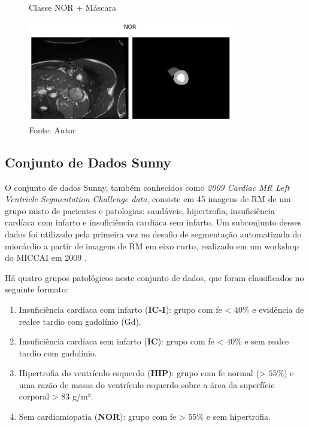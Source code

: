\begin{figure}[H]
    \centering
    \caption{Classe NOR + Máscara}
    \includegraphics[width=0.8\textwidth]{figures/fig033-03.png}
    \caption*{Fonte: Autor}
    \label{fig:fig033-03}
\end{figure}

\subsection{Conjunto de Dados Sunny} 
\label{subsec:cap4_sunny}

O conjunto de dados Sunny, também conhecidos como \textit{2009 Cardiac MR Left Ventricle Segmentation Challenge data}, consiste em 45 imagens de RM de um grupo misto de pacientes e patologias: saudáveis, hipertrofia, insuficiência cardíaca com infarto e insuficiência cardíaca sem infarto. Um subconjunto desses dados foi utilizado pela primeira vez no desafio de segmentação automatizada do miocárdio a partir de imagens de RM em eixo curto, realizado em um workshop do MICCAI em 2009 \cite{radauEvaluationFrameworkAlgorithms2009}. 

Há quatro grupos patológicos neste conjunto de dados, que foram classificados no seguinte formato:

\begin{enumerate}
    \item Insuficiência cardíaca com infarto (\textbf{IC-I}): grupo com \gls{fe} < $40$\% e evidência de realce tardio com gadolínio (Gd).
    \item Insuficiência cardíaca sem infarto (\textbf{IC}): grupo com \gls{fe} < $40$\% e sem realce tardio com gadolínio.
    \item Hipertrofia do ventrículo esquerdo (\textbf{HIP}): grupo com \gls{fe} normal (> $55$\%) e uma razão de massa do ventrículo esquerdo sobre a área da superfície corporal > $83$ g/m².
    \item Sem cardiomiopatia (\textbf{NOR}): grupo com \gls{fe} > $55$\% e sem hipertrofia.
\end{enumerate}

